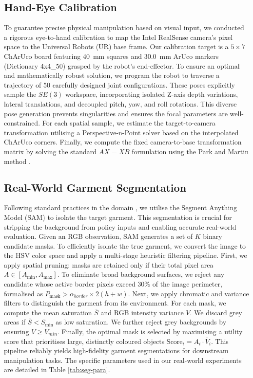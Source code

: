 \documentclass[journal]{IEEEtran}
\begin{document}
\subsection{Hand-Eye Calibration} \label{sec:calibration}

To guarantee precise physical manipulation based on visual input, we conducted a rigorous eye-to-hand calibration to map the Intel RealSense camera's pixel space to the Universal Robots (UR) base frame. Our calibration target is a $5 \times 7$ ChArUco board \cite{garrido2014automatic} featuring 40~mm squares and 30.0~mm ArUco markers (Dictionary 4x4\_50) grasped by the robot's end-effector. To ensure an optimal and mathematically robust solution, we program the robot to traverse a trajectory of 50 carefully designed joint configurations. These poses explicitly sample the $SE(3)$ workspace, incorporating isolated Z-axis depth variations, lateral translations, and decoupled pitch, yaw, and roll rotations. This diverse pose generation prevents singularities and ensures the focal parameters are well-constrained. For each spatial sample, we estimate the target-to-camera transformation utilising a Perspective-n-Point solver based on the interpolated ChArUco corners. Finally, we compute the fixed camera-to-base transformation matrix by solving the standard $AX=XB$ formulation using the Park and Martin method \cite{park1994robot}.




\subsection{Real-World Garment Segmentation} \label{sec:real-world-cloth-seg}
Following standard practices in the domain \cite{canberk2023cloth, lin2022learning, kadi2025draper}, we utilise the Segment Anything Model (SAM) \cite{kirillov2023segment} to isolate the target garment. This segmentation is crucial for stripping the background from policy inputs and enabling accurate real-world evaluation. Given an RGB observation, SAM generates a set of $K$ binary candidate masks. To efficiently isolate the true garment, we convert the image to the HSV color space and apply a multi-stage heuristic filtering pipeline. First, we apply spatial pruning: masks are retained only if their total pixel area $A \in [A_{\text{min}}, A_{\text{max}}]$. To eliminate broad background surfaces, we reject any candidate whose active border pixels exceed 30\% of the image perimeter, formalised as $P_{\text{mask}} > \alpha_{border} \times 2(h + w)$. Next, we apply chromatic and variance filters to distinguish the garment from its environment. For each mask, we compute the mean saturation $\bar{S}$ and RGB intensity variance $V$. We discard grey areas if $\bar{S} < S_{\text{min}}$ as low saturation. We further reject grey backgrounds by ensuring $ V \geq V_{min}$. Finally, the optimal mask is selected by maximising a utility score that prioritises large, distinctly coloured objects $\text{Score}_i = A_i \cdot \bar{V}_i$. This pipeline reliably yields high-fidelity garment segmentations for downstream manipulation tasks. The specific parameters used in our real-world experiments are detailed in Table \ref{tab:seg-para}.
\end{document}
